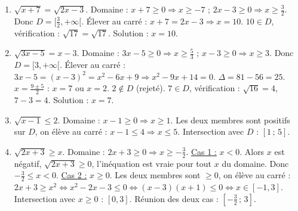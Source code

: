\documentclass[11pt]{article}
\begin{document}
\begin{corrige}
\begin{enumerate}
\item $\sqrt{x+7} = \sqrt{2x-3}$.
Domaine : $x+7\ge0 \Rightarrow x\ge-7$ ; $2x-3\ge0 \Rightarrow x\ge\frac32$. Donc $D=[\frac32,+\infty[$.
Élever au carré : $x+7 = 2x-3 \Rightarrow x=10$.
$10 \in D$, vérification : $\sqrt{17}=\sqrt{17}$. Solution : $\boxed{x=10}$.
\item $\sqrt{3x-5} = x-3$.
Domaine : $3x-5\ge0 \Rightarrow x\ge\frac53$ ; $x-3\ge0 \Rightarrow x\ge3$. Donc $D=[3,+\infty[$.
Élever au carré : $3x-5 = (x-3)^2 = x^2-6x+9 \Rightarrow x^2-9x+14=0$.
$\Delta=81-56=25$. $x=\frac{9\pm5}{2}$ : $x=7$ ou $x=2$.
$2 \notin D$ (rejeté). $7 \in D$, vérification : $\sqrt{16}=4$, $7-3=4$. Solution : $\boxed{x=7}$.
\item $\sqrt{x-1} \le 2$.
Domaine : $x-1\ge0 \Rightarrow x\ge1$.
Les deux membres sont positifs sur $D$, on élève au carré : $x-1 \le 4 \Rightarrow x \le 5$.
Intersection avec $D$ : $\boxed{[1\,;\,5]}$.
\item $\sqrt{2x+3} \ge x$.
Domaine : $2x+3\ge0 \Rightarrow x\ge-\frac32$.
\underline{Cas 1 :} $x < 0$. Alors $x$ est négatif, $\sqrt{2x+3}\ge0$, l'inéquation est vraie pour tout $x$ du domaine. Donc $-\frac32 \le x < 0$.
\underline{Cas 2 :} $x \ge 0$. Les deux membres sont $\ge0$, on élève au carré : $2x+3 \ge x^2 \iff x^2-2x-3 \le 0 \iff (x-3)(x+1)\le0 \iff x\in[-1,3]$.
Intersection avec $x\ge0$ : $[0,3]$.
Réunion des deux cas : $\boxed{[-\frac32\,;\,3]}$.
\end{enumerate}
\end{corrige}
\end{document}
